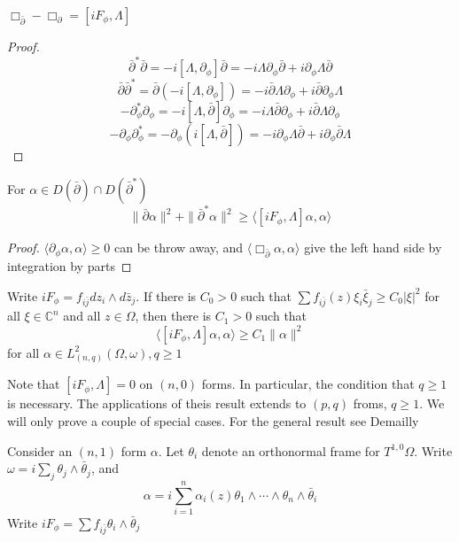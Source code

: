 \documentclass[../main.tex]{subfiles}
\begin{document}
\begin{lemma}
$\Box_{\bar\partial}-\Box_\partial=[iF_\phi,\Lambda]$
\end{lemma}

\begin{proof}
\[\bar\partial^*\bar\partial=-i[\Lambda,\partial_\phi]\bar\partial=-i\Lambda\partial_\phi\bar\partial+i\partial_\phi\Lambda\bar\partial\]
\[\bar\partial\bar\partial^*=\bar\partial(-i[\Lambda,\partial_\phi])=-i\bar\partial\Lambda\partial_\phi+i\bar\partial\partial_\phi\Lambda\]
\[-\partial^*_\phi\partial_\phi=-i[\Lambda,\bar\partial]\partial_\phi=-i\Lambda\bar\partial\partial_\phi+i\bar\partial\Lambda\partial_\phi\]
\[-\partial_\phi\partial^*_\phi=-\partial_\phi(i[\Lambda,\bar\partial])=-i\partial_\phi\Lambda\bar\partial+i\partial_\phi\bar\partial\Lambda\]
\end{proof}

\begin{corollary}
For $\alpha\in D(\bar\partial)\cap D(\bar\partial^*)$
\[\|\bar\partial\alpha\|^2+\|\bar\partial^*\alpha\|^2\geq\langle[iF_\phi,\Lambda]\alpha,\alpha\rangle\]
\end{corollary}

\begin{proof}
$\langle\partial_\phi\alpha,\alpha\rangle\geq0$ can be throw away, and $\langle\Box_{\bar\partial}\alpha,\alpha\rangle$ give the left hand side by integration by parts
\end{proof}

\begin{lemma}
Write $iF_\phi=f_{i\bar j}dz_i\wedge d\bar z_j$. If there is $C_0>0$ such that $\sum f_{i\bar j}(z)\xi_i\bar\xi_j\geq C_0|\xi|^2$ for all $\xi\in\mathbb C^n$ and all $z\in\Omega$, then there is $C_1>0$ such that
\[\langle[iF_\phi,\Lambda]\alpha,\alpha\rangle\geq C_1\|\alpha\|^2\]
for all $\alpha\in L^2_{(n,q)}(\Omega,\omega),q\geq1$
\end{lemma}

Note that $[iF_\phi,\Lambda]=0$ on $(n,0)$ forms. In particular, the condition that $q\geq1$ is necessary. The applications of theis result extends to $(p,q)$ froms, $q\geq1$. We will only prove a couple of special cases. For the general result see Demailly

\begin{example}
Consider an $(n,1)$ form $\alpha$. Let $\theta_i$ denote an orthonormal frame for $T^{1,0}\Omega$. Write $\omega=i\sum_j\theta_j\wedge\bar\theta_j$, and
\[\alpha=i\sum_{i=1}^n\alpha_i(z)\theta_1\wedge\cdots\wedge\theta_n\wedge\bar\theta_i\]
Write $iF_\phi=\sum f_{i\bar j}\theta_i\wedge\bar\theta_j$
\end{example}
\end{document}
